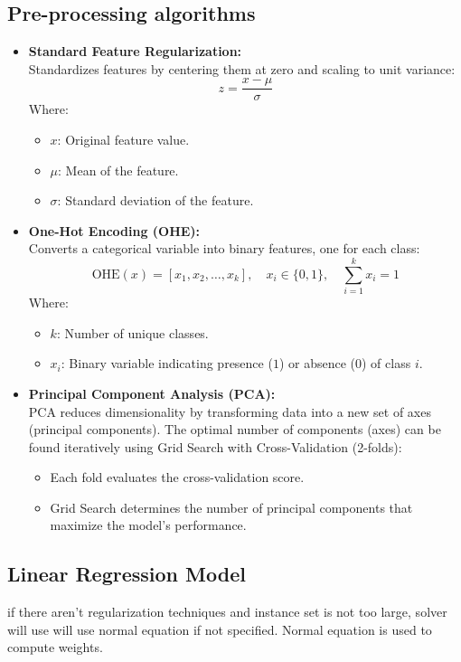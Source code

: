 \documentclass{article}
\begin{document}
\subsection{Pre-processing algorithms}

\begin{itemize}
    \item \textbf{Standard Feature Regularization:} \\
    Standardizes features by centering them at zero and scaling to unit variance:
    \[
    z = \frac{x - \mu}{\sigma}
    \]
    Where:
    \begin{itemize}
        \item \( x \): Original feature value.
        \item \( \mu \): Mean of the feature.
        \item \( \sigma \): Standard deviation of the feature.
    \end{itemize}
    
    \item \textbf{One-Hot Encoding (OHE):} \\
    Converts a categorical variable into binary features, one for each class:
    \[
    \text{OHE}(x) = [x_1, x_2, \dots, x_k], \quad x_i \in \{0, 1\}, \quad \sum_{i=1}^k x_i = 1
    \]
    Where:
    \begin{itemize}
        \item \( k \): Number of unique classes.
        \item \( x_i \): Binary variable indicating presence (\( 1 \)) or absence (\( 0 \)) of class \( i \).
    \end{itemize}

    \item \textbf{Principal Component Analysis (PCA):} \\
    PCA reduces dimensionality by transforming data into a new set of axes (principal components). The optimal number of components (axes) can be found iteratively using Grid Search with Cross-Validation (2-folds):
    \begin{itemize}
        \item Each fold evaluates the cross-validation score.
        \item Grid Search determines the number of principal components that maximize the model's performance.
    \end{itemize}

\end{itemize}
\subsection{Linear Regression Model}
if there aren't regularization techniques and instance set is not too large,
solver will use will use normal equation if not specified. Normal equation is used to compute weights.
\end{document}
